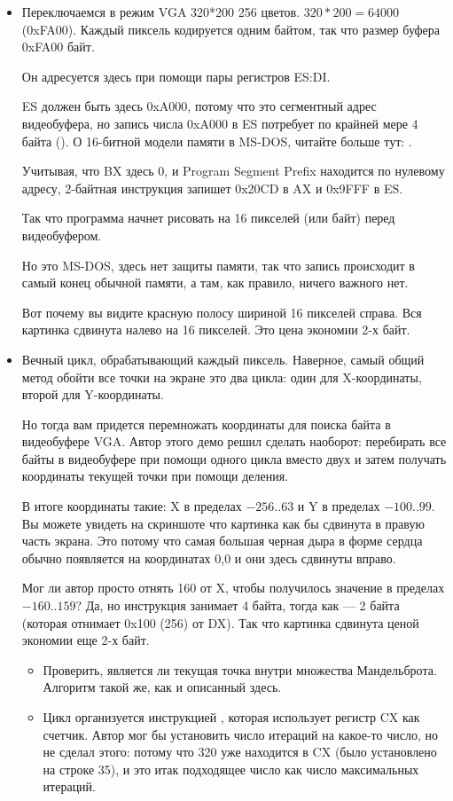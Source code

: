 \begin{itemize}
\item Переключаемся в режим VGA 320*200 256 цветов. 
$320*200=64000$ (0xFA00). 
Каждый пиксель кодируется одним байтом, так что размер буфера 0xFA00 байт.

Он адресуется здесь при помощи пары регистров ES:DI.

ES должен быть здесь 0xA000, потому что это сегментный адрес видеобуфера, но запись
числа 0xA000 в ES потребует по крайней мере 4 байта (). 
О 16-битной модели памяти в MS-DOS, читайте больше тут: 
.

Учитывая, что BX здесь 0, и Program Segment Prefix находится по нулевому адресу, 2-байтная инструкция
 запишет 0x20CD в AX и 0x9FFF в ES.

Так что программа начнет рисовать на 16 пикселей (или байт) перед видеобуфером.

Но это MS-DOS, 
здесь нет защиты памяти, так что запись происходит в самый конец обычной памяти, а там, как правило, ничего важного нет.

Вот почему вы видите красную полосу шириной 16 пикселей справа.
Вся картинка сдвинута налево на 16 пикселей.
Это цена экономии 2-х байт.

\item Вечный цикл, обрабатывающий каждый пиксель.
Наверное, самый общий метод обойти все точки на экране это два цикла:
один для X-координаты, второй для Y-координаты.

Но тогда вам придется перемножать координаты для поиска байта в видеобуфере VGA.
Автор этого демо решил сделать наоборот: перебирать все байты в видеобуфере при помощи одного цикла
вместо двух и затем получать координаты текущей точки при помощи деления.

В итоге координаты такие: X в пределах $-256..63$ и Y 
в пределах $-100..99$.
Вы можете увидеть на скриншоте что картинка как бы сдвинута в правую часть экрана.
Это потому что самая большая черная дыра в форме сердца обычно появляется на координатах 0,0 и они
здесь сдвинуты вправо.

Мог ли автор просто отнять 160 от X, чтобы получилось значение в пределах $-160..159$? 
Да, но инструкция  занимает 4 байта, 
тогда как  --- 2 байта 
(которая отнимает 0x100 (256) от DX). 
Так что картинка сдвинута ценой экономии еще 2-х байт.

    \begin{itemize}
    \item Проверить, является ли текущая точка внутри множества Мандельброта.
          Алгоритм такой же, как и описанный здесь.
     \item Цикл организуется инструкцией , которая использует регистр CX как счетчик.
Автор мог бы установить число итераций на какое-то число, но не сделал этого: потому что 320 уже
находится в CX (было установлено на строке 35), и это итак подходящее число как число максимальных
итераций.


\end{itemize}
\end{itemize}
